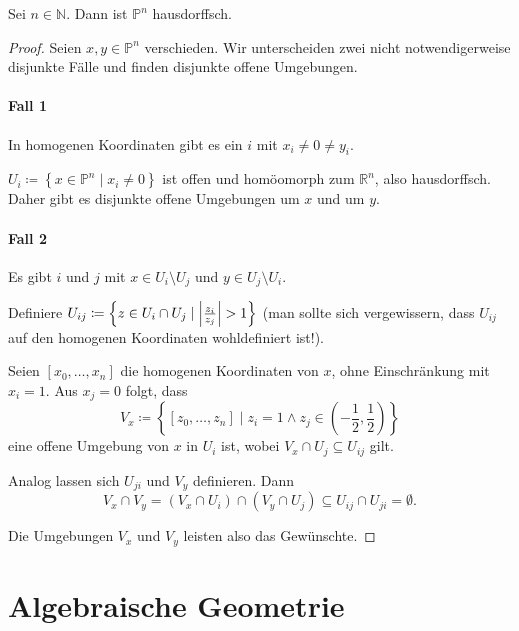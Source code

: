 \documentclass[ngerman, 11pt, a4paper, twoside, abstracton]{scrbook}
\begin{document}
\begin{exercise}
  Sei $n\in\mathbb{N}$. Dann ist $\mathbb{P}^n$ hausdorffsch.
\end{exercise}
\begin{proof}
  Seien $x, y \in \mathbb{P}^n$ verschieden. Wir unterscheiden zwei nicht notwendigerweise disjunkte Fälle und finden disjunkte offene Umgebungen.

  \paragraph{Fall 1} In homogenen Koordinaten gibt es ein $i$ mit $x_i \ne 0 \ne y_i$.
  
  $U_i \coloneqq \left\{ x \in \mathbb{P}^n \mid x_i \ne 0 \right\}$ ist offen und homöomorph zum $\mathbb{R}^n$, also hausdorffsch. Daher gibt es disjunkte offene Umgebungen um $x$ und um $y$.
  \paragraph{Fall 2} Es gibt $i$ und $j$ mit $x\in U_i \setminus U_j$ und $y\in U_j \setminus U_i$.

  Definiere $U_{ij} \coloneqq \left\{ z\in U_i \cap U_j \mid \abs{\frac{z_i}{z_j}} > 1\right\}$ (man sollte sich vergewissern, dass $U_{ij}$ auf den homogenen Koordinaten wohldefiniert ist!).

  Seien $\left[ x_0, \ldots, x_n \right]$ die homogenen Koordinaten von $x$, ohne Einschränkung mit $x_i = 1$. Aus $x_j = 0$ folgt, dass
  \[
    V_x \coloneqq \left\{ \left[ z_0, \ldots, z_n \right] \mid z_i = 1 \land z_j \in \left( -\frac{1}{2}, \frac{1}{2} \right) \right\}
  \]
  eine offene Umgebung von $x$ in $U_i$ ist, wobei $V_x \cap U_j \subseteq U_{ij}$ gilt.

  Analog lassen sich $U_{ji}$ und $V_y$ definieren. Dann
  \[
    V_x \cap V_y = \left( V_x \cap U_i \right) \cap \left( V_y \cap U_j \right) \subseteq U_{ij} \cap U_{ji} = \emptyset.
  \]

  Die Umgebungen $V_x$ und $V_y$ leisten also das Gewünschte.
\end{proof}
\section{Algebraische Geometrie}
\end{document}
